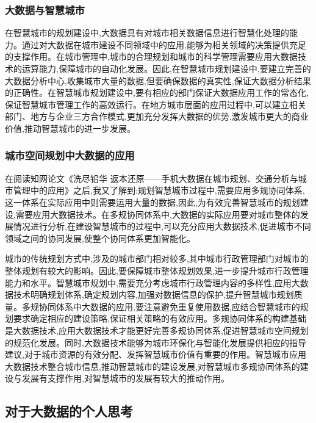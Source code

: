 \documentclass{article}
\begin{document}
\subsubsection{大数据与智慧城市}

在智慧城市的规划建设中,大数据具有对城市相关数据信息进行智慧化处理的能力。通过对大数据在城市建设不同领域中的应用,能够为相关领域的决策提供充足的支撑作用。在城市管理中,城市的合理规划和城市的科学管理需要应用大数据技术的运算能力,保障城市的自动化发展。因此,在智慧城市规划建设中,要建立完善的大数据分析中心,收集城市大量的数据,但要确保数据的真实性,保证大数据分析结果的正确性。在智慧城市规划建设中,要有相应的部门保证大数据应用工作的常态化,保证智慧城市管理工作的高效运行。在地方城市层面的应用过程中,可以建立相关部门、地方与企业三方合作模式,更加充分发挥大数据的优势,激发城市更大的商业价值,推动智慧城市的进一步发展。

\subsubsection{城市空间规划中大数据的应用}

在阅读知网论文《洗尽铅华 返本还原——手机大数据在城市规划、交通分析与城市管理中的应用》\cite{ref7}之后,我又了解到:规划智慧城市过程中,需要应用多规协同体系,这一体系在实际应用中则需要运用大量的数据,因此,为有效完善智慧城市的规划建设,需要应用大数据技术。在多规协同体系中,大数据的实际应用要对城市整体的发展情况进行分析,在建设智慧城市的过程中,可以充分应用大数据技术,促进城市不同领域之间的协同发展,使整个协同体系更加智能化。

城市的传统规划方式中,涉及的城市部门相对较多,其中城市行政管理部门对城市的整体规划有较大的影响。因此,要保障城市整体规划效果,进一步提升城市行政管理能力和水平。智慧城市规划中,需要充分考虑城市行政管理内容的多样性,应用大数据技术明确规划体系,确定规划内容,加强对数据信息的保护,提升智慧城市规划质量。多规协同体系中大数据的应用,要注意避免重复使用数据,应结合智慧城市的规划要求确定相应的建设策略,保证相关策略的有效应用。多规协同体系的构建基础是大数据技术,应用大数据技术才能更好完善多规协同体系,促进智慧城市空间规划的规范化发展。同时,大数据技术能够为城市环保化与智能化发展提供相应的指导建议,对于城市资源的有效分配、发挥智慧城市价值有重要的作用。智慧城市应用大数据技术整合城市信息,推动智慧城市的建设发展,对智慧城市多规协同体系的建设与发展有支撑作用,对智慧城市的发展有较大的推动作用。

\subsection{对于大数据的个人思考}
\end{document}
